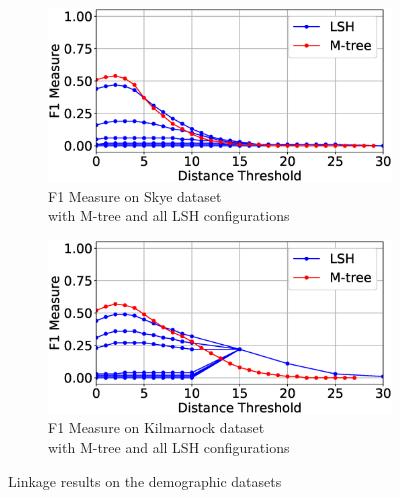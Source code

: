 \documentclass{llncs}
\begin{document}
\begin{figure}
\begin{subfigure}{.5\textwidth}
  \centering
\includegraphics[width=\textwidth]{figures/plotFs-skye-f}
\vspace{-6mm}
\caption{F1 Measure on Skye dataset \\ with M-tree and all LSH configurations}
\end{subfigure}%
\begin{subfigure}{.5\textwidth}
  \centering
\includegraphics[width=\textwidth]{figures/plotFs-kilmarnock-f}
\vspace{-6mm}
\caption{F1 Measure on Kilmarnock dataset \\ with M-tree and all LSH configurations}
\end{subfigure}
\caption{Linkage results on the demographic datasets}
\label{demography-quality}
\end{figure}

\end{document}
